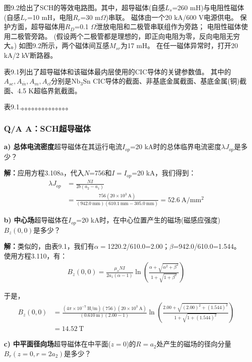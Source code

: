 图9.2给出了SCH的等效电路图。其中，超导磁体(自感$L_s$=260 mH)与电阻性磁体(自感$L_r$=10 mH，电阻$R_r$=30 m$\Omega$)串联。
磁体由一个20 kA/600 V电源供电。
保护方面，超导磁体用$R_D$=0.1 $\Omega$泄放电阻和二极管串联组作为旁路；
电阻性磁体使用二极管旁路。
(假设两个二极管都是理想的，即正向电阻为零，反向电阻无穷大。)
如图9.2所示，两个磁体间互感$M_{sr}$为17 mH。
在任一磁体异常时，打开20 kA/2 kV断路器。

表9.1列出了超导磁体和该磁体最内层使用的CIC导体的关键参数值。
其中的$A_{sc},A_{\bar{m}},A_{m},A_{cl}$分别是$\mathrm{Nb_3 Sn}$ CIC导体的截面、非基底金属截面、基底金属(铜)截面、4.5 K超临界氦截面。

表9.1.。。。。。。。。。。。。。。

\subsubsection{Q/A A：SCH超导磁体}
\textbf{a) 总体电流密度}\qquad 超导磁体在其运行电流$I_{op}$=20 kA时的总体临界电流密度$\lambda J_{op}$是多少？

\textbf{解：}应用方程3.108a，代入$N$=756和$I=I_{op}$=20 kA，我们得到：
\begin{align*}%
\lambda J_{op}&=\frac{NI}{2b(a_2-a_1)}\\ \tag{3.108a}
&=\frac{756(20\times10^3\ \mathrm{A})}{(942.0\ \mathrm{mm})(610.1\ \mathrm{mm}-305.0\ \mathrm{mm})}=52.6\ \mathrm{A/mm^2}
\end{align*}

\textbf{b) 中心场}\qquad 超导磁体在$I_{op}$=20 kA时，在中心位置产生的磁场(磁感应强度)$B_z(0,0)$是多少？

\textbf{解：}类似的，由表9.1，我们有$\alpha=$1220.2/610.0=2.00；$\beta$=942.0/610.0=1.544。
使用方程3.110，有：
\begin{align*}%
B_{z}(0,0)=\frac{\mu_oNI}{2a_1(\alpha-1)}\ln(\frac{\alpha+\sqrt{\alpha^2+\beta^2}}{1+\sqrt{1+\beta^2}}) \tag{3.110}
\end{align*}

于是，
\begin{align*}%
B_z(0,0)&=\frac{(4\pi\times10^{-7}\ \mathrm{H/m})(756)(20\times10^3\ \mathrm{A})}{(0.610\ \mathrm{m})(2.00-1)}\ln(\frac{2.00+\sqrt{(2.00)^2+(1.544)^2}}{1+\sqrt{1+(1.544)^2}})\\
&=14.52\ \mathrm{T}
\end{align*}

\textbf{c) 中平面径向场}\qquad 超导磁体在中平面($z=0$)的$R=a_2$处产生的磁场的径向分量$B_r(z=0,r=2a_2)$是多少？

